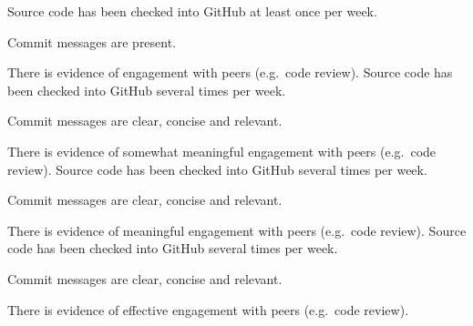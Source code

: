 \documentclass{../fal_assignment}
\begin{document}
\begin{markingrubric}
        \grade Source code  has been checked into GitHub at least once per week.
            \par Commit messages are present.
            \par There is evidence of engagement with peers (e.g.\ code review).
        \grade Source code  has been checked into GitHub several times per week.
            \par Commit messages are clear, concise and relevant.
            \par There is evidence of somewhat meaningful engagement with peers (e.g.\ code review).
        \grade Source code has been checked into GitHub several times per week.
            \par Commit messages are clear, concise and relevant.
            \par There is evidence of meaningful engagement with peers (e.g.\ code review).
        \grade Source code has been checked into GitHub several times per week.
            \par Commit messages are clear, concise and relevant.
            \par There is evidence of effective engagement with peers (e.g.\ code review).
%
\end{markingrubric}
\end{document}
